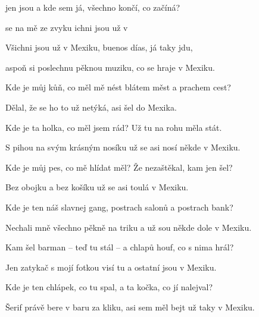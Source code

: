 

\zs
{} jen jsou a kde sem já,  všechno končí, co začíná?

 se na mě  ze zvyku ichni jsou už 
v 
\ks

\zr
Všichni jsou už v Mexiku, buenos días, já taky jdu,

aspoň si poslechnu pěknou muziku, co se hraje v Mexiku.
\kr

\zs
Kde je můj kůň, co měl mě nést blátem měst a prachem cest?

Dělal, že se ho to už netýká, asi šel do Mexika.
\ks

\zs
Kde je ta holka, co měl jsem rád? Už tu na rohu měla stát.

S pihou na svým krásným nosíku už se asi nosí někde v Mexiku.
\ks

\zr
\kr

\zs
Kde je můj pes, co mě hlídat měl? Že nezaštěkal, kam jen šel?

Bez obojku a bez košíku už se asi toulá v Mexiku.
\ks

\zs
Kde je ten náš slavnej gang, postrach salonů a postrach bank?

Nechali mně všechno pěkně na triku a už sou někde dole v Mexiku.
\ks

\zr
\kr



\zs
Kam šel barman -- teď tu stál -- a chlapů houf, co s nima hrál?

Jen zatykač s mojí fotkou visí tu a ostatní jsou v Mexiku.
\ks

\zs
Kde je ten chlápek, co tu spal, a ta kočka, co jí nalejval?

Šerif právě bere v baru za kliku, asi sem měl bejt už taky v Mexiku.
\ks

\zr\kr \zr\kr


\kp

